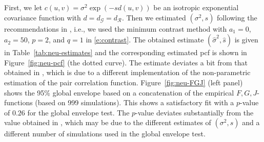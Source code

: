 \documentclass[alpha-refs]{wiley-article}
\begin{document}

First, we let $c(u,v)=\sigma^2\exp(-sd(u,v))$ be an isotropic exponential covariance function with $d=d_{\mathcal G}=d_{\mathcal R}$. Then we estimated $(\sigma^2,s)$ following the recommendations in \citet{HeidiMe}, i.e., we %
used the minimum contrast method with  $a_1=0$, $a_2=50$, $p=2$, and $q=1$ in \eqref{e:contrast}.
The obtained estimate $(\hat\sigma^2,\hat s)$ is given in Table~\ref{tab:neu-estimates} and the corresponding estimated pcf is shown in Figure~\ref{fig:neu-pcf} (the dotted curve). The estimate 
deviates a bit from that obtained in \citet{HeidiMe}, which is due to a different implementation of the non-parametric estimation of the pair correlation function.
Figure~\ref{fig:neu-FGJ} (left panel) shows the 95\% global envelope based on a concatenation of the empirical $F,G,J$-functions (based on 999 simulations). This shows a satisfactory fit with a $p$-value of $0.26$ for the global envelope test. The $p$-value deviates substantially from the value obtained in \citet{HeidiMe}, which may be due to the different estimates of $(\sigma^2,s)$ and a different number of simulations used in the global envelope test.
\end{document}
